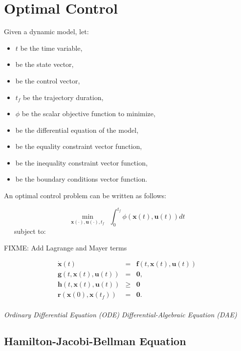 \section{Optimal Control}

Given a dynamic model, let:
\begin{itemize}
\item $t$ be the time variable,
\item \state{} be the state vector, 
\item \control{} be the control vector,
\item $t_f$ be the trajectory duration,
\item $\phi$ be the scalar objective function to minimize,
\item \dfcn{} be the differential equation of the model,
\item \eqcstr{} be the equality constraint vector function,
\item \ineqcstr{} be the inequality constraint vector function,
\item \bndcstr{} be the boundary conditions vector function. 
\end{itemize}

An optimal control problem can be written as follows:

\label{OCP}
\begin{equation}
  \min_{\mathbf{x} (\cdot), \mathbf{u} (\cdot), t_f} \ \ 
  \int_{0}^{t_{f}}\phi (\mathbf{x}(t), \mathbf{u}(t))dt
  \label{OCP:Obj}
\end{equation}
\ \ \ subject to:

FIXME: Add Lagrange and Mayer terms

\begin{equation}
  \begin{array}{rcl}
  \dot{\mathbf{x}} (t) & = & \mathbf{f}(t, \mathbf{x}(t), \mathbf{u}(t))
  \label{OCP:Model}
  \\
  \mathbf{g}(t, \mathbf{x}(t), \mathbf{u}(t)) & = & \mathbf{0},
  \\
  \mathbf{h}(t, \mathbf{x}(t), \mathbf{u}(t)) & \ge & \mathbf{0}%
  \\
  \mathbf{r} (\mathbf{x}(0), \mathbf{x}(t_{f})) & = & \mathbf{0}.
  \\
  \end{array}
\end{equation} 

\emph{Ordinary Differential Equation (ODE)}
\emph{Differential-Algebraic Equation (DAE)}

\subsection{Hamilton-Jacobi-Bellman Equation}

